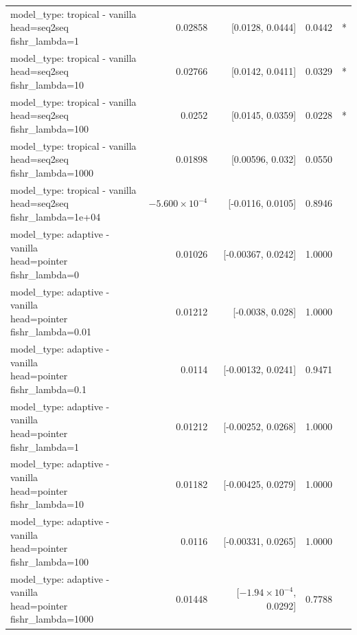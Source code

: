 \documentclass[10pt]{article}
\makeatletter
\newcommand{\stackcell}[1]{\begin{tabular}[t]{@{}l@{}}#1\end{tabular}}
\makeatother
\begin{document}
{\begin{longtable}{lrrrl}
\stackcell{model\_type: tropical - vanilla\\\footnotesize head=seq2seq fishr\_lambda=1 } & 0.02858 & [0.0128, 0.0444] & 0.0442 & *\\
\stackcell{model\_type: tropical - vanilla\\\footnotesize head=seq2seq fishr\_lambda=10 } & 0.02766 & [0.0142, 0.0411] & 0.0329 & *\\
\stackcell{model\_type: tropical - vanilla\\\footnotesize head=seq2seq fishr\_lambda=100 } & 0.0252 & [0.0145, 0.0359] & 0.0228 & *\\
\stackcell{model\_type: tropical - vanilla\\\footnotesize head=seq2seq fishr\_lambda=1000 } & 0.01898 & [0.00596, 0.032] & 0.0550 & \\
\stackcell{model\_type: tropical - vanilla\\\footnotesize head=seq2seq fishr\_lambda=1e+04 } & $-5.600\times10^{-4}$ & [-0.0116, 0.0105] & 0.8946 & \\
\stackcell{model\_type: adaptive - vanilla\\\footnotesize head=pointer fishr\_lambda=0 } & 0.01026 & [-0.00367, 0.0242] & 1.0000 & \\
\stackcell{model\_type: adaptive - vanilla\\\footnotesize head=pointer fishr\_lambda=0.01 } & 0.01212 & [-0.0038, 0.028] & 1.0000 & \\
\stackcell{model\_type: adaptive - vanilla\\\footnotesize head=pointer fishr\_lambda=0.1 } & 0.0114 & [-0.00132, 0.0241] & 0.9471 & \\
\stackcell{model\_type: adaptive - vanilla\\\footnotesize head=pointer fishr\_lambda=1 } & 0.01212 & [-0.00252, 0.0268] & 1.0000 & \\
\stackcell{model\_type: adaptive - vanilla\\\footnotesize head=pointer fishr\_lambda=10 } & 0.01182 & [-0.00425, 0.0279] & 1.0000 & \\
\stackcell{model\_type: adaptive - vanilla\\\footnotesize head=pointer fishr\_lambda=100 } & 0.0116 & [-0.00331, 0.0265] & 1.0000 & \\
\stackcell{model\_type: adaptive - vanilla\\\footnotesize head=pointer fishr\_lambda=1000 } & 0.01448 & [$-1.94\times10^{-4}$, 0.0292] & 0.7788 & \\

\end{longtable}}
\end{document}
